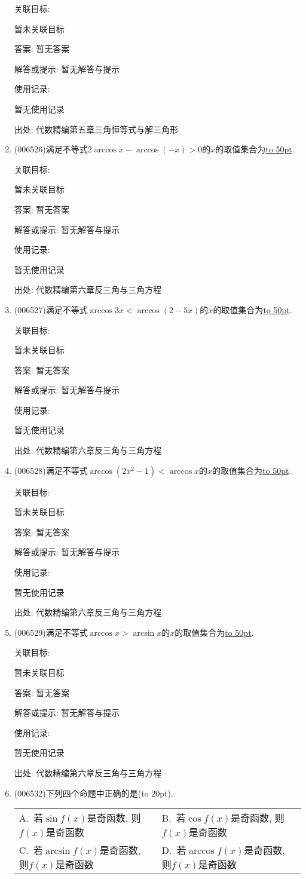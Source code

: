 \documentclass[10pt,a4paper]{article}
\newcommand{\blank}[1]{\underline{\hbox to #1pt{}}}
\newcommand{\bracket}[1]{(\hbox to #1pt{})}
\newcommand{\twoch}[4]{\par\begin{tabular}{p{.46\textwidth}p{.46\textwidth}}
A.~#1& B.~#2\\
C.~#3& D.~#4
\end{tabular}}
\begin{document}
\begin{enumerate}[1.]
关联目标:

暂未关联目标

答案: 暂无答案

解答或提示: 暂无解答与提示

使用记录:

暂无使用记录


出处: 代数精编第五章三角恒等式与解三角形
\item { (006526)}满足不等式$2\arccos x-\arccos (-x)>0$的$x$的取值集合为\blank{50}.


关联目标:

暂未关联目标

答案: 暂无答案

解答或提示: 暂无解答与提示

使用记录:

暂无使用记录


出处: 代数精编第六章反三角与三角方程
\item { (006527)}满足不等式$\arccos 3x<\arccos (2-5x)$的$x$的取值集合为\blank{50}.


关联目标:

暂未关联目标

答案: 暂无答案

解答或提示: 暂无解答与提示

使用记录:

暂无使用记录


出处: 代数精编第六章反三角与三角方程
\item { (006528)}满足不等式$\arccos (2x^2-1)<\arccos x$的$x$的取值集合为\blank{50}.


关联目标:

暂未关联目标

答案: 暂无答案

解答或提示: 暂无解答与提示

使用记录:

暂无使用记录


出处: 代数精编第六章反三角与三角方程
\item { (006529)}满足不等式$\arccos x>\arcsin x$的$x$的取值集合为\blank{50}.


关联目标:

暂未关联目标

答案: 暂无答案

解答或提示: 暂无解答与提示

使用记录:

暂无使用记录


出处: 代数精编第六章反三角与三角方程
\item { (006532)}下列四个命题中正确的是\bracket{20}.
\twoch{若$\sin f(x)$是奇函数, 则$f(x)$是奇函数}{若$\cos f(x)$是奇函数, 则$f(x)$是奇函数}{若$\arcsin f(x)$是奇函数, 则$f(x)$是奇函数}{若$\arccos f(x)$是奇函数, 则$f(x)$是奇函数}



\end{enumerate}
\end{document}
